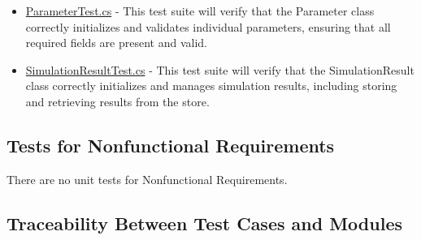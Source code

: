 \documentclass[12pt, titlepage]{article}
\begin{document}
\begin{itemize}
  \item \href{https://github.com/gr812b/CVT-Simulator/blob/main/src/frontend/CommunicationProtocolUnitTesting/ParameterTest.cs}{ParameterTest.cs}
  \label{test:ParameterTest} - This test suite will verify that the Parameter class correctly initializes and validates individual parameters, ensuring that all required fields are present and valid.

  \item \href{https://github.com/gr812b/CVT-Simulator/blob/main/src/frontend/CommunicationProtocolUnitTesting/SimulationResultTest.cs}{SimulationResultTest.cs}
  \label{test:SimulationResultTest} - This test suite will verify that the SimulationResult class correctly initializes and manages simulation results, including storing and retrieving results from the store.
\end{itemize}


\subsection{Tests for Nonfunctional Requirements}
There are no unit tests for Nonfunctional Requirements.

\subsection{Traceability Between Test Cases and Modules}
\end{document}
